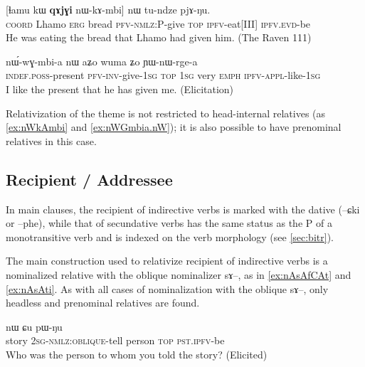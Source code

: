 \documentclass[oldfontcommands,oneside,a4paper,11pt]{article}
\newcommand{\ipa}[1]{{\phon #1}} %
\begin{document}
\begin{exe}
\ex \label{ex:nWkAmbi}
\gll      \ipa{tɕe} 	[\ipa{ɬamu} 	\ipa{kɯ} 	\textbf{\ipa{qɤjɣi}} 	\ipa{nɯ-kɤ-mbi}] 	\ipa{nɯ} 	\ipa{tu-ndze} 	\ipa{pjɤ-ŋu.}   \\
\textsc{coord} Lhamo \textsc{erg} bread \textsc{pfv-nmlz}:P-give \textsc{top} \textsc{ipfv}-eat[III] \textsc{ipfv.evd}-be  \\
 \glt    He was eating the bread that Lhamo had given him. (The Raven 111)
\end{exe} 

      \begin{exe}
   \ex \label{ex:nWGmbia.nW}
 \gll  \ipa{tɤ-pɤro}  	\ipa{nɯ́-wɣ-mbi-a}  	\ipa{nɯ}  	\ipa{aʑo}  	\ipa{wuma}  	\ipa{ʑo}  	\ipa{ɲɯ-nɯ-rge-a}  	 \\
 \textsc{indef.poss}-present \textsc{pfv-inv}-give-\textsc{1sg} \textsc{top} \textsc{1sg} very \textsc{emph} \textsc{ipfv-appl}-like-\textsc{1sg}   \\
\glt  I like the present that he has given me. (Elicitation)
\end{exe}


Relativization of the theme is not restricted to head-internal relatives  (as  \ref{ex:nWkAmbi} and \ref{ex:nWGmbia.nW}); it is also possible to have prenominal relatives in this case.

\subsection{Recipient / Addressee}

In main clauses, the recipient of indirective verbs is marked with the dative (\ipa{--ɕki} or \ipa{--phe}), while that of secundative verbs has the same status as the P of a monotransitive verb and is indexed on the verb morphology (see \ref{sec:bitr}).

The main construction used to relativize recipient of indirective verbs is a nominalized  relative with the oblique nominalizer \ipa{sɤ}--, as in \ref{ex:nAsAfCAt} and \ref{ex:nAsAti}. As with all cases of nominalization with the oblique \ipa{sɤ}--, only headless and prenominal relatives are found.


\begin{exe}
\ex \label{ex:nAsAfCAt}
\gll [\ipa{χpi}  	\ipa{nɤ-sɤ-fɕɤt}]  	\ipa{tɯrme}  	\ipa{nɯ}  	\ipa{ɕu}  	\ipa{pɯ-ŋu}    \\
story \textsc{2sg-nmlz:oblique}-tell person \textsc{top}   \textsc{pst.ipfv}-be\\
\glt Who was the person to whom you told the story? (Elicited)
\end{exe} 
\end{document}
